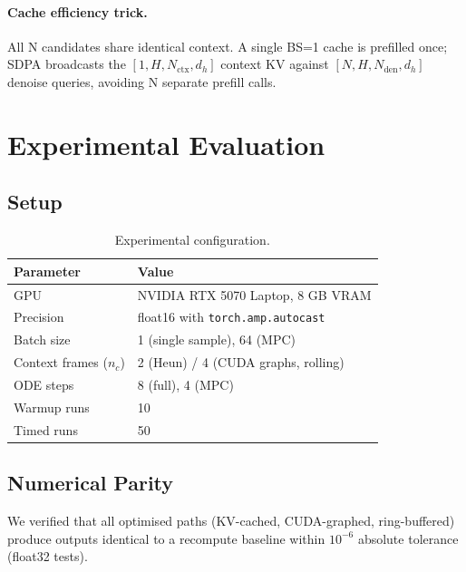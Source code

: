 \documentclass[letterpaper,twocolumn,10pt]{article}
\begin{document}
\paragraph{Cache efficiency trick.}
All N candidates share identical context.  A single BS=1 cache is
prefilled once; SDPA broadcasts the $[1, H, N_{\mathrm{ctx}}, d_h]$
context KV against $[N, H, N_{\mathrm{den}}, d_h]$ denoise queries,
avoiding N separate prefill calls.

\section{Experimental Evaluation}

\subsection{Setup}

\begin{table}[t]
\centering
\caption{Experimental configuration.}
\label{tab:setup}
\begin{tabular}{@{}ll@{}}
\toprule
\textbf{Parameter} & \textbf{Value} \\
\midrule
GPU & NVIDIA RTX 5070 Laptop, 8 GB VRAM \\
Precision & float16 with \texttt{torch.amp.autocast} \\
Batch size & 1 (single sample), 64 (MPC) \\
Context frames ($n_c$) & 2 (Heun) / 4 (CUDA graphs, rolling) \\
ODE steps & 8 (full), 4 (MPC) \\
Warmup runs & 10 \\
Timed runs & 50 \\
\bottomrule
\end{tabular}
\end{table}

\subsection{Numerical Parity}

We verified that all optimised paths (KV-cached, CUDA-graphed,
ring-buffered) produce outputs identical to a recompute baseline within
$10^{-6}$ absolute tolerance (float32 tests).
\end{document}
